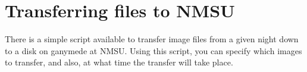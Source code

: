 \documentclass[10pt]{report}
\begin{document}

\chapter{Transferring files to NMSU}

There is a simple script available to transfer image files from
a given night down to a disk on ganymede at NMSU. Using this script, you
can specify which images to transfer, and also, at what time
the transfer will take place. 

\end{document}
